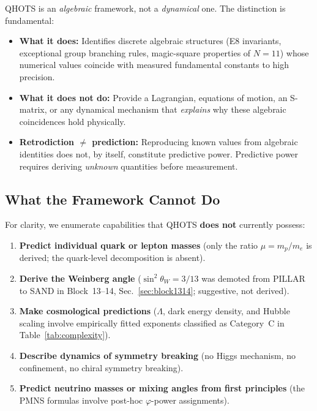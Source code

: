 \documentclass[aps,prd,twocolumn,superscriptaddress,floatfix,nofootinbib]{revtex4-2}
\theoremstyle{definition}
\theoremstyle{remark}
\newcommand{\vp}{\varphi}
\begin{document}
QHOTS is an \emph{algebraic} framework, not a \emph{dynamical} one.
The distinction is fundamental:

\begin{itemize}
\item \textbf{What it does:} Identifies discrete algebraic structures
      (E8 invariants, exceptional group branching rules, magic-square
      properties of $N{=}11$) whose numerical values coincide with
      measured fundamental constants to high precision.

\item \textbf{What it does not do:} Provide a Lagrangian, equations of
      motion, an S-matrix, or any dynamical mechanism that
      \emph{explains} why these algebraic coincidences hold physically.

\item \textbf{Retrodiction $\neq$ prediction:} Reproducing known
      values from algebraic identities does not, by itself, constitute
      predictive power.  Predictive power requires deriving
      \emph{unknown} quantities before measurement.
\end{itemize}

\subsection{What the Framework Cannot Do}

For clarity, we enumerate capabilities that QHOTS \textbf{does not}
currently possess:

\begin{enumerate}
\item \textbf{Predict individual quark or lepton masses} (only the
      ratio $\mu = m_p/m_e$ is derived; the quark-level decomposition
      is absent).
\item \textbf{Derive the Weinberg angle} ($\sin^2\theta_W = 3/13$ was
      demoted from PILLAR to SAND in Block~13--14, Sec.~\ref{sec:block1314};
      suggestive, not derived).
\item \textbf{Make cosmological predictions} ($\Lambda$, dark energy
      density, and Hubble scaling involve empirically fitted exponents
      classified as Category~C in Table~\ref{tab:complexity}).
\item \textbf{Describe dynamics of symmetry breaking} (no Higgs
      mechanism, no confinement, no chiral symmetry breaking).
\item \textbf{Predict neutrino masses or mixing angles from first
      principles} (the PMNS formulas involve post-hoc $\vp$-power
      assignments).
\end{enumerate}
\end{document}
